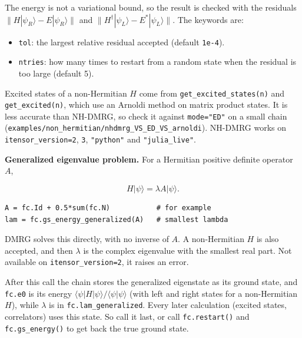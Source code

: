 \documentclass[11pt]{article}
\providecommand{\tightlist}{\setlength{\itemsep}{0pt}\setlength{\parskip}{0pt}}
\begin{document}
The energy is not a variational bound, so the result is checked with the
residuals \(\lVert H|\psi_R\rangle-E|\psi_R\rangle\rVert\) and
\(\lVert H^\dagger|\psi_L\rangle-E^*|\psi_L\rangle\rVert\). The keywords are:

\begin{itemize}
\tightlist
\item
  \texttt{tol}: the largest relative residual accepted (default \texttt{1e-4}).
\item
  \texttt{ntries}: how many times to restart from a random state when the residual
  is too large (default 5).
\end{itemize}

Excited states of a non-Hermitian \(H\) come from \texttt{get\_\allowbreak{}excited\_\allowbreak{}states(n)} and
\texttt{get\_\allowbreak{}excited(n)}, which use an Arnoldi method on matrix product states. It
is less accurate than NH-DMRG, so check it against \texttt{mode="ED"} on a small
chain (\texttt{examples/non\_\allowbreak{}hermitian/nhdmrg\_\allowbreak{}VS\_\allowbreak{}ED\_\allowbreak{}VS\_\allowbreak{}arnoldi}). NH-DMRG works on
\texttt{itensor\_\allowbreak{}version=2}, \texttt{3}, \texttt{"python"} and \texttt{"julia\_\allowbreak{}live"}.

\textbf{Generalized eigenvalue problem.} For a Hermitian positive definite
operator \(A\),

\[H|\psi\rangle=\lambda A|\psi\rangle .\]

\begin{lstlisting}
A = fc.Id + 0.5*sum(fc.N)           # for example
lam = fc.gs_energy_generalized(A)   # smallest lambda
\end{lstlisting}

DMRG solves this directly, with no inverse of \(A\). A non-Hermitian \(H\) is
also accepted, and then \(\lambda\) is the complex eigenvalue with the
smallest real part. Not available on \texttt{itensor\_\allowbreak{}version=2}, it raises an
error.

After this call the chain stores the generalized eigenstate as its ground
state, and \texttt{fc.\allowbreak{}e0} is its energy
\(\langle\psi|H|\psi\rangle/\langle\psi|\psi\rangle\) (with left and right
states for a non-Hermitian \(H\)), while \(\lambda\) is in
\texttt{fc.\allowbreak{}lam\_\allowbreak{}generalized}. Every later calculation (excited states,
correlators) uses this state. So call it last, or call \texttt{fc.\allowbreak{}restart()} and
\texttt{fc.\allowbreak{}gs\_\allowbreak{}energy()} to get back the true ground state.
\end{document}
